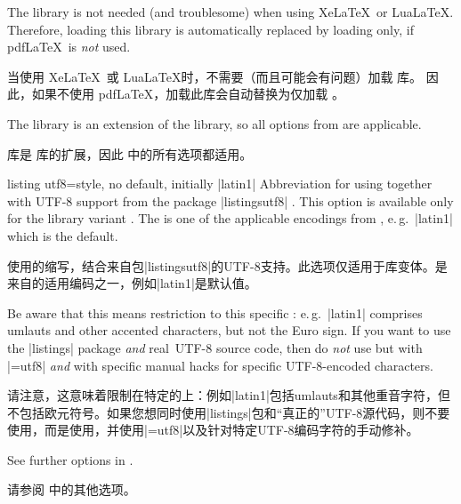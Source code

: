 \begin{marker}
The  library is not needed (and troublesome) when using Xe\LaTeX\ or Lua\LaTeX.
Therefore, loading this library is automatically replaced by loading
 only, if pdf\LaTeX\ is \emph{not} used.

当使用 Xe\LaTeX\ 或 Lua\LaTeX 时，不需要（而且可能会有问题）加载  库。 因此，如果不使用 pdf\LaTeX，加载此库会自动替换为仅加载 。
\end{marker}

The  library is an extension of the
 library, so
all options from  are applicable.

 库是  库的扩展，因此  中的所有选项都适用。
\begin{docTcbKey}{listing utf8}{=}{style, no default, initially |latin1|}
  Abbreviation for using 
  together with UTF-8 support from the package |listingsutf8| .
  This option is available only for the library variant .
  The  is one of
  the applicable encodings from , e.\,g.\ |latin1|
  which is the default.\par

  使用的缩写，结合来自包|listingsutf8|的UTF-8支持。此选项仅适用于库变体。是来自的适用编码之一，例如|latin1|是默认值。
  
  Be aware that this means restriction to this specific :
  e.\,g.\ |latin1| comprises umlauts and other accented characters, but not
  the Euro sign. If you want to use the |listings| package \emph{and} \flqq real\frqq\
  UTF-8 source code, then do \emph{not} use  but 
  with
  |=utf8|
  \emph{and} with specific manual hacks for specific UTF-8-encoded characters.



请注意，这意味着限制在特定的上：例如|latin1|包括umlauts和其他重音字符，但不包括欧元符号。如果您想同时使用|listings|包和“真正的”UTF-8源代码，则不要使用，而是使用，并使用|=utf8|以及针对特定UTF-8编码字符的手动修补。
\end{docTcbKey}

See further options in .

请参阅  中的其他选项。